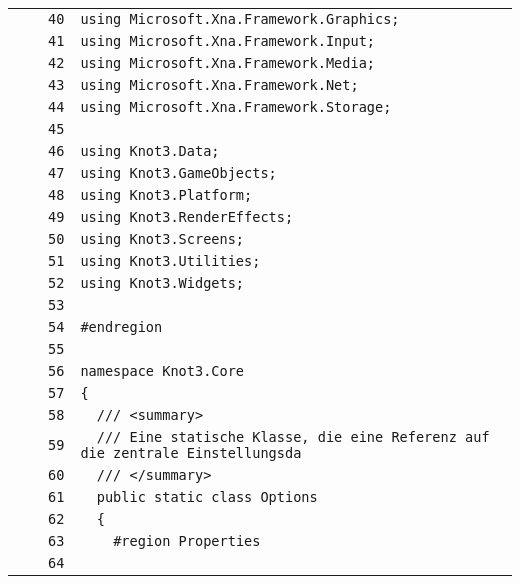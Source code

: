 \documentclass[a4paper,10pt]{article}
\begin{document}
\begin{longtable}[l]{lrrl}
\cellcolor{gray} &  & \verb~40~ & \verb~using Microsoft.Xna.Framework.Graphics;~\\
\cellcolor{gray} &  & \verb~41~ & \verb~using Microsoft.Xna.Framework.Input;~\\
\cellcolor{gray} &  & \verb~42~ & \verb~using Microsoft.Xna.Framework.Media;~\\
\cellcolor{gray} &  & \verb~43~ & \verb~using Microsoft.Xna.Framework.Net;~\\
\cellcolor{gray} &  & \verb~44~ & \verb~using Microsoft.Xna.Framework.Storage;~\\
\cellcolor{gray} &  & \verb~45~ & \verb~~\\
\cellcolor{gray} &  & \verb~46~ & \verb~using Knot3.Data;~\\
\cellcolor{gray} &  & \verb~47~ & \verb~using Knot3.GameObjects;~\\
\cellcolor{gray} &  & \verb~48~ & \verb~using Knot3.Platform;~\\
\cellcolor{gray} &  & \verb~49~ & \verb~using Knot3.RenderEffects;~\\
\cellcolor{gray} &  & \verb~50~ & \verb~using Knot3.Screens;~\\
\cellcolor{gray} &  & \verb~51~ & \verb~using Knot3.Utilities;~\\
\cellcolor{gray} &  & \verb~52~ & \verb~using Knot3.Widgets;~\\
\cellcolor{gray} &  & \verb~53~ & \verb~~\\
\cellcolor{gray} &  & \verb~54~ & \verb~#endregion~\\
\cellcolor{gray} &  & \verb~55~ & \verb~~\\
\cellcolor{gray} &  & \verb~56~ & \verb~namespace Knot3.Core~\\
\cellcolor{gray} &  & \verb~57~ & \verb~{~\\
\cellcolor{gray} &  & \verb~58~ & \verb~  /// <summary>~\\
\cellcolor{gray} &  & \verb~59~ & \verb~  /// Eine statische Klasse, die eine Referenz auf die zentrale Einstellungsda~\\
\cellcolor{gray} &  & \verb~60~ & \verb~  /// </summary>~\\
\cellcolor{gray} &  & \verb~61~ & \verb~  public static class Options~\\
\cellcolor{gray} &  & \verb~62~ & \verb~  {~\\
\cellcolor{gray} &  & \verb~63~ & \verb~    #region Properties~\\
\cellcolor{gray} &  & \verb~64~ & \verb~~\\

\end{longtable}
\end{document}
